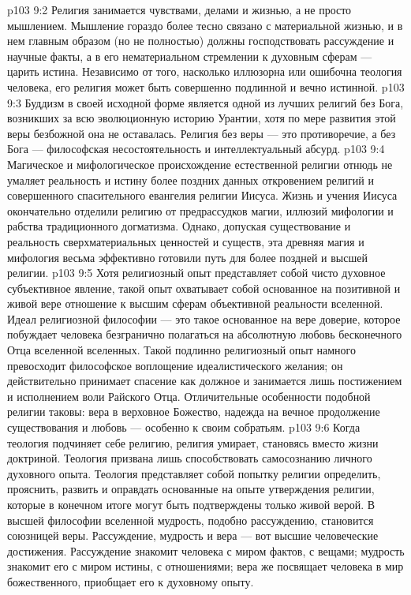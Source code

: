 \vs p103 9:2 Религия занимается чувствами, делами и жизнью, а не просто мышлением. Мышление гораздо более тесно связано с материальной жизнью, и в нем главным образом (но не полностью) должны господствовать рассуждение и научные факты, а в его нематериальном стремлении к духовным сферам --- царить истина. Независимо от того, насколько иллюзорна или ошибочна теология человека, его религия может быть совершенно подлинной и вечно истинной.
\vs p103 9:3 Буддизм в своей исходной форме является одной из лучших религий без Бога, возникших за всю эволюционную историю Урантии, хотя по мере развития этой веры безбожной она не оставалась. Религия без веры --- это противоречие, а без Бога --- философская несостоятельность и интеллектуальный абсурд.
\vs p103 9:4 Магическое и мифологическое происхождение естественной религии отнюдь не умаляет реальность и истину более поздних данных откровением религий и совершенного спасительного евангелия религии Иисуса. Жизнь и учения Иисуса окончательно отделили религию от предрассудков магии, иллюзий мифологии и рабства традиционного догматизма. Однако, допуская существование и реальность сверхматериальных ценностей и существ, эта древняя магия и мифология весьма эффективно готовили путь для более поздней и высшей религии.
\vs p103 9:5 Хотя религиозный опыт представляет собой чисто духовное субъективное явление, такой опыт охватывает собой основанное на позитивной и живой вере отношение к высшим сферам объективной реальности вселенной. Идеал религиозной философии --- это такое основанное на вере доверие, которое побуждает человека безгранично полагаться на абсолютную любовь бесконечного Отца вселенной вселенных. Такой подлинно религиозный опыт намного превосходит философское воплощение идеалистического желания; он действительно принимает спасение как должное и занимается лишь постижением и исполнением воли Райского Отца. Отличительные особенности подобной религии таковы: вера в верховное Божество, надежда на вечное продолжение существования и любовь --- особенно к своим собратьям.
\vs p103 9:6 \pc Когда теология подчиняет себе религию, религия умирает, становясь вместо жизни доктриной. Теология призвана лишь способствовать самосознанию личного духовного опыта. Теология представляет собой попытку религии определить, прояснить, развить и оправдать основанные на опыте утверждения религии, которые в конечном итоге могут быть подтверждены только живой верой. В высшей философии вселенной мудрость, подобно рассуждению, становится союзницей веры. Рассуждение, мудрость и вера --- вот высшие человеческие достижения. Рассуждение знакомит человека с миром фактов, с вещами; мудрость знакомит его с миром истины, с отношениями; вера же посвящает человека в мир божественного, приобщает его к духовному опыту.

